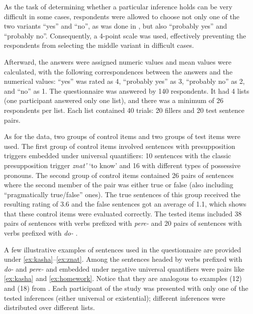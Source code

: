 As the task of determining whether a particular inference holds can be very difficult in some cases, respondents were allowed to choose not only one of the two variants ``yes'' and ``no'', as was done in \citealt{Chemla:09}, but also ``probably yes'' and ``probably no''. Consequently, a 4-point scale was used, effectively preventing the respondents from selecting the middle variant in difficult cases.

Afterward, the answers were assigned numeric values and mean values were calculated, with the following correspondences between the answers and the numerical values: ``yes'' was rated as 4, ``probably yes'' as 3, ``probably no'' as 2, and ``no'' as 1. The questionnaire was answered by 140 respondents. It had 4 lists (one participant answered only one list), and there was a minimum of 26 respondents per list. Each list contained 40 trials: 20 fillers and 20 test sentence pairs.

As for the data, two groups of control items and two groups of test items were used. The first group of control items involved sentences with presupposition triggers embedded under universal quantifiers: 10 sentences with the classic presupposition trigger \textit{znat'} `to know' and 16 with different types of possessive pronouns. The second group of control items contained 26 pairs of sentences where the second member of the pair was either true or false (also including ``pragmatically true/false'' ones). The true sentences of this group received the resulting rating of 3.6 and the false sentences got an average of 1.1, which shows that these control items were evaluated correctly. The tested items included 38 pairs of sentences with verbs prefixed with \textit{pere-}   and 20 pairs of sentences with verbs prefixed with \textit{do-}  .

A few illustrative examples of sentences used in the questionnaire are provided under \ref{ex:kasha}--\ref{ex:znat}. Among the sentences headed by verbs prefixed with \textit{do-}   and \textit{pere-}   and embedded under negative universal quantifiers were pairs like \ref{ex:kasha} and \ref{ex:homework}. Notice that they are analogous to examples (12) and (18) from \citealt{Chemla:09}. Each participant  of the study was presented with only one of the tested inferences (either universal or existential); different inferences were distributed over different lists.

